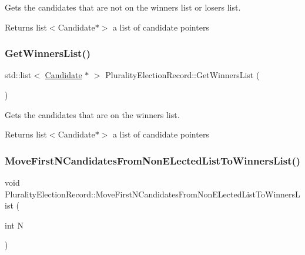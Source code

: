 Gets the candidates that are not on the winners list or losers list. 

\begin{DoxyReturn}{Returns}
list$<$\+Candidate$\ast$$>$ a list of candidate pointers 
\end{DoxyReturn}
\mbox{\label{classPluralityElectionRecord_a5b5da69173023ac0441918b0485b58b9}} 
\subsubsection{\texorpdfstring{Get\+Winners\+List()}{GetWinnersList()}}
{\footnotesize\ttfamily std\+::list$<$ \hyperlink{classCandidate}{Candidate} $\ast$ $>$ Plurality\+Election\+Record\+::\+Get\+Winners\+List (\begin{DoxyParamCaption}{ }\end{DoxyParamCaption})}



Gets the candidates that are on the winners list. 

\begin{DoxyReturn}{Returns}
list$<$\+Candidate$\ast$$>$ a list of candidate pointers 
\end{DoxyReturn}
\mbox{\label{classPluralityElectionRecord_a9463aecae88c5decfdbb793678b16c87}} 
\subsubsection{\texorpdfstring{Move\+First\+N\+Candidates\+From\+Non\+E\+Lected\+List\+To\+Winners\+List()}{MoveFirstNCandidatesFromNonELectedListToWinnersList()}}
{\footnotesize\ttfamily void Plurality\+Election\+Record\+::\+Move\+First\+N\+Candidates\+From\+Non\+E\+Lected\+List\+To\+Winners\+List (\begin{DoxyParamCaption}\item[{int}]{N }\end{DoxyParamCaption})}



